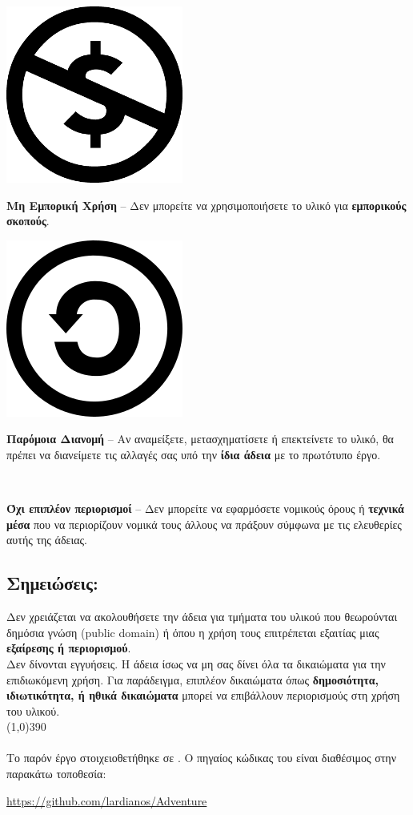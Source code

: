 \vspace{1em}
\noindent
\parbox{1.5cm}{\includegraphics[scale=0.15]{license/images/cc_nc_30}}
\parbox{10.5cm}{\textbf{Μη Εμπορική Χρήση} --  Δεν μπορείτε να χρησιμοποιήσετε το υλικό για \textbf{εμπορικούς σκοπούς}.}

\vspace{1em}
\noindent
\parbox{1.5cm}{\includegraphics[scale=0.15]{license/images/cc_sa_30}}
\parbox{10.5cm}{\textbf{Παρόμοια Διανομή}  -- Αν αναμείξετε, μετασχηματίσετε ή επεκτείνετε το υλικό, θα πρέπει να διανείμετε τις αλλαγές σας υπό την \textbf{ίδια άδεια} με το πρωτότυπο έργο.}

\vspace{1em}
\noindent
\parbox{1.5cm}{\ }
\parbox{10.5cm}{\textbf{Όχι επιπλέον περιορισμοί} -- Δεν μπορείτε να εφαρμόσετε νομικούς όρους ή \textbf{τεχνικά μέσα} που να περιορίζουν νομικά τους άλλους να πράξουν σύμφωνα με τις ελευθερίες αυτής της άδειας.}
\subsection*{Σημειώσεις:}
\noindent
Δεν χρειάζεται να ακολουθήσετε την άδεια για τμήματα του υλικού που θεωρούνται δημόσια γνώση (public domain) ή όπου η χρήση τους επιτρέπεται εξαιτίας μιας \textbf{εξαίρεσης ή περιορισμού}.\\

\noindent
Δεν δίνονται εγγυήσεις. Η άδεια ίσως να μη σας δίνει όλα τα δικαιώματα για την επιδιωκόμενη χρήση. Για παράδειγμα, επιπλέον δικαιώματα όπως \textbf{δημοσιότητα, ιδιωτικότητα, ή ηθικά δικαιώματα} μπορεί να επιβάλλουν περιορισμούς στη χρήση του υλικού.\\
\line(1,0){390}\\\\
\noindent
Το παρόν έργο στοιχειοθετήθηκε σε \XeLaTeX. Ο πηγαίος κώδικας του είναι διαθέσιμος στην παρακάτω τοποθεσία:
\begin{center}
\url{https://github.com/lardianos/Adventure}
\end{center}
\newpage